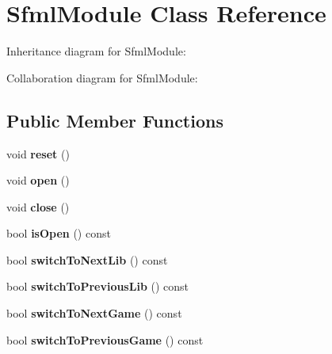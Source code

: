 \hypertarget{class_sfml_module}{}\section{Sfml\+Module Class Reference}
\label{class_sfml_module}


Inheritance diagram for Sfml\+Module\+:


Collaboration diagram for Sfml\+Module\+:
\subsection*{Public Member Functions}
\begin{DoxyCompactItemize}
\item 
\mbox{\label{class_sfml_module_aa1bf41004d3a110f521ae9f5859e8757}} 
void {\bfseries reset} ()
\item 
\mbox{\label{class_sfml_module_a982a04fcf6ac1272a3f07eeae487d147}} 
void {\bfseries open} ()
\item 
\mbox{\label{class_sfml_module_a3effef08f2791fb519fcfd159bc378d2}} 
void {\bfseries close} ()
\item 
\mbox{\label{class_sfml_module_a1681ad36e68961aa78ba218982605e0b}} 
bool {\bfseries is\+Open} () const
\item 
\mbox{\label{class_sfml_module_aed8638965e651f965ea575d24a2b889d}} 
bool {\bfseries switch\+To\+Next\+Lib} () const
\item 
\mbox{\label{class_sfml_module_a7789084ddc1c266538e718d2f8b05045}} 
bool {\bfseries switch\+To\+Previous\+Lib} () const
\item 
\mbox{\label{class_sfml_module_ac1f3893458d5e166f5b7f78f03be41f8}} 
bool {\bfseries switch\+To\+Next\+Game} () const
\item 
\mbox{\label{class_sfml_module_a2f799bbbd4c513add9ff67ac4216ad51}} 
bool {\bfseries switch\+To\+Previous\+Game} () const
\item 
\mbox{\label{class_sfml_module_ab9aea8534da43252d9f8786807657db6}} 

\end{DoxyCompactItemize}
